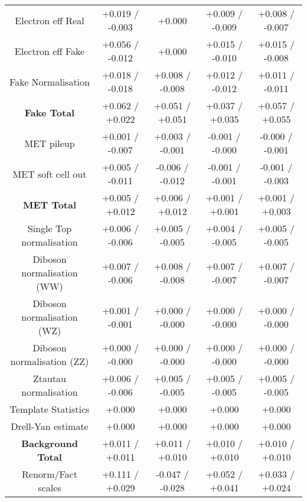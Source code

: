 \begin{table}[htbp]
\begin{center}
\begin{tabular}{|c|c|c|c|c|}
Electron eff Real                     &+0.019   / -0.003   & +0.000              & +0.009   / -0.009   & +0.008   / -0.007  \\
Electron eff Fake                     &+0.056   / -0.012   & +0.000              & +0.015   / -0.010   & +0.015   / -0.008  \\
Fake Normalisation                    &+0.018   / -0.018   & +0.008   / -0.008   & +0.012   / -0.012   & +0.011   / -0.011  \\
\hline
\textbf{Fake Total}                   &+0.062   / +0.022   & +0.051   / +0.051   & +0.037   / +0.035   & +0.057   / +0.055  \\
\hline
MET pileup                            &+0.001   / -0.007   & +0.003   / -0.001   & -0.001   / -0.000   & -0.000   / -0.001  \\
MET soft cell out                     &+0.005   / -0.011   & -0.006   / -0.012   & -0.001   / -0.001   & -0.001   / -0.003  \\
\hline
\textbf{MET Total}                    &+0.005   / +0.012   & +0.006   / +0.012   & +0.001   / +0.001   & +0.001   / +0.003  \\
\hline
Single Top normalisation              &+0.006   / -0.006   & +0.005   / -0.005   & +0.004   / -0.005   & +0.005   / -0.005  \\
Diboson normalisation (WW)            &+0.007   / -0.006   & +0.008   / -0.008   & +0.007   / -0.007   & +0.007   / -0.007  \\
Diboson normalisation (WZ)            &+0.001   / -0.001   & +0.000   / -0.000   & +0.000   / -0.000   & +0.000   / -0.000  \\
Diboson normalisation (ZZ)            &+0.000   / -0.000   & +0.000   / -0.000   & +0.000   / -0.000   & +0.000   / -0.000  \\
Ztautau normalisation                 &+0.006   / -0.006   & +0.005   / -0.005   & +0.005   / -0.005   & +0.005   / -0.005  \\
Template Statistics                   &+0.000              & +0.000              & +0.000              & +0.000             \\
Drell-Yan estimate                    &+0.000              & +0.000              & +0.000              & +0.000             \\
\hline
\textbf{Background Total}             &+0.011   / +0.011   & +0.011   / +0.010   & +0.010   / +0.010   & +0.010   / +0.010  \\
\hline
Renorm/Fact scales                    &+0.111   / +0.029   & -0.047   / -0.028   & +0.052   / +0.041   & +0.033   / +0.024  \\

\end{tabular}
\end{center}
\end{table}
